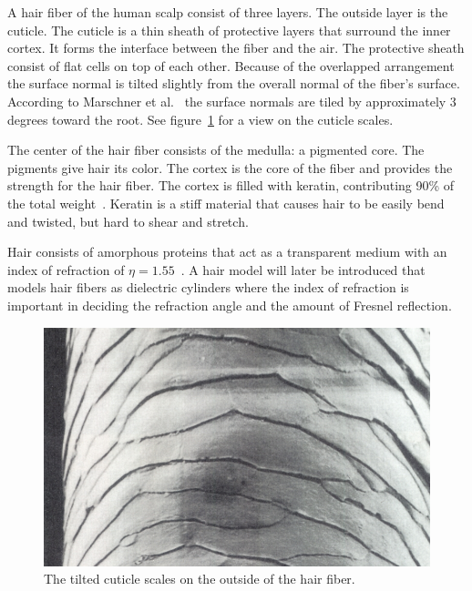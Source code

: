 \documentclass[11pt,a4paper]{report}
\begin{document}
A hair fiber of the human scalp consist of three layers. The outside layer is the cuticle. The cuticle is a thin sheath of protective layers that surround the inner cortex. It forms the interface between the fiber and the air. The protective sheath consist of flat cells on top of each other. Because of the overlapped arrangement the surface normal is tilted slightly from the overall normal of the fiber's surface. According to Marschner et al.~\cite{marschner} the surface normals are tiled by approximately 3 degrees toward the root. See figure~\ref{fig_hair_structure} for a view on the cuticle scales.

The center of the hair fiber consists of the medulla: a pigmented core. The pigments give hair its color. The cortex is the core of the fiber and provides the strength for the hair fiber. The cortex is filled with keratin, contributing 90\% of the total weight~\cite{ward}. Keratin is a stiff material that causes hair to be easily bend and twisted, but hard to shear and stretch.

Hair consists of amorphous proteins that act as a transparent medium with an index of refraction of $\eta = 1.55$~\cite{ward}. A hair model will later be introduced that models hair fibers as dielectric cylinders where the index of refraction is important in deciding the refraction angle and the amount of Fresnel reflection.

\begin{figure}[h]
\begin{center}
\includegraphics[scale=0.4]{images/hair_structure.jpeg}
\caption{The tilted cuticle scales on the outside of the hair fiber.}
\label{fig_hair_structure}
\end{center}
\end{figure}
\end{document}
